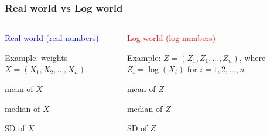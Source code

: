 \documentclass[11pt]{beamer}
\newcommand{\myframe}[1]{\begin{frame} \frametitle{#1}}
\begin{document}
\myframe{Real world vs Log world}
\begin{columns}
\begin{column}{0.45\textwidth}
\textcolor{blue}{Real world (real numbers)}

Example: weights $X = (X_1, X_2, \dots, X_n)$ \pause

\begin{center}
\end{center} \pause

\centering
mean of $X$

median of $X$

SD of $X$
\end{column} \pause
\begin{column}{0.1\textwidth}
\vspace{-5cm}
\begin{center}
\end{center}
\end{column} \pause
\begin{column}{0.45\textwidth}
\textcolor{red}{Log world (log numbers)}

Example: {\fontsize{9pt}{7.2}\selectfont $Z = (Z_1, Z_1, \dots, Z_n)$, where $Z_i = \log(X_i)$ for} {\tiny $i = 1, 2, \dots, n$} \pause

\begin{center}
\end{center} \pause

\centering
mean of $Z$ 

median of $Z$ 

SD of $Z$
\end{column}
\end{columns}
\end{frame}
\end{document}
